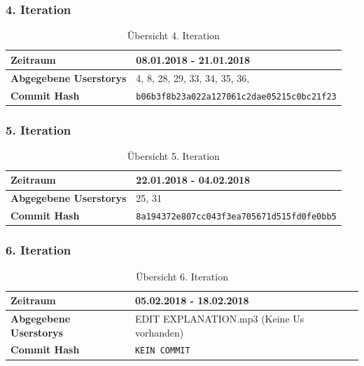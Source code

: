 \documentclass[accentcolor=tud9c,12pt,paper=a4]{tudreport}
\begin{document}
	\subsubsection{4. Iteration}
	\begin{table}[H]
	\begin{center}
		\begin{tabular}{| l | l |}
			\hline
			\textbf{Zeitraum} & 08.01.2018 - 21.01.2018\\\hline
			\textbf{Abgegebene Userstorys} & 4, 8, 28, 29, 33, 34, 35, 36, \\\hline
			\textbf{Commit Hash} & \texttt{b06b3f8b23a022a127061c2dae05215c0bc21f23} \\\hline
		\end{tabular}
		\caption{Übersicht 4. Iteration}
	\end{center}
	\end{table}

	\subsubsection{5. Iteration}
	\begin{table}[H]
	\begin{center}
		\begin{tabular}{| l | l |}
			\hline
			\textbf{Zeitraum} &  22.01.2018 - 04.02.2018\\\hline
			\textbf{Abgegebene Userstorys} & 25, 31\\\hline
			\textbf{Commit Hash} & \texttt{8a194372e807cc043f3ea705671d515fd0fe0bb5} \\\hline
		\end{tabular}
		\caption{Übersicht 5. Iteration}
	\end{center}
	\end{table}

	\subsubsection{6. Iteration}
	\begin{table}[H]
	\begin{center}
		\begin{tabular}{| l | l |}
			\hline
			\textbf{Zeitraum} &  05.02.2018 - 18.02.2018\\\hline
			\textbf{Abgegebene Userstorys} & EDIT EXPLANATION.mp3 (Keine Us vorhanden)\\\hline
			\textbf{Commit Hash} & \texttt{KEIN COMMIT} \\\hline
		\end{tabular}
		\caption{Übersicht 6. Iteration}
	\end{center}
	\end{table}
\end{document}
